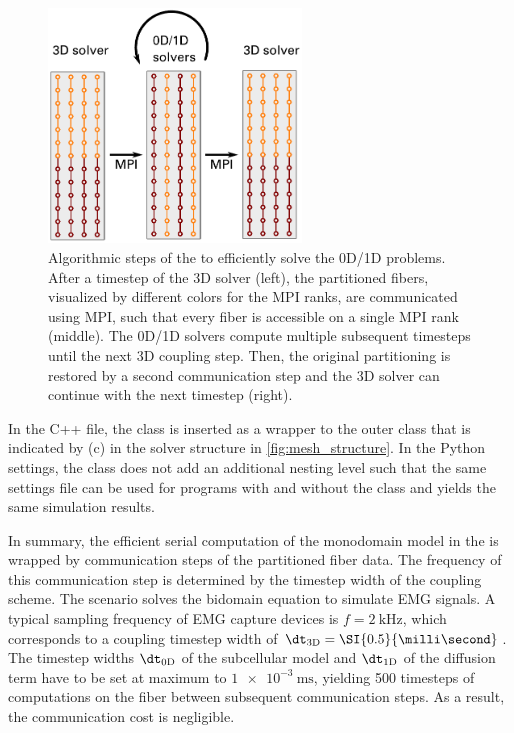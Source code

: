 \begin{figure}
  \centering%
  \includegraphics[width=0.6\textwidth]{images/implementation/fast_monodomain_scheme.pdf}
  \caption{Algorithmic steps of the  to efficiently solve the 0D/1D problems. After a timestep of the 3D solver (left), the partitioned fibers, visualized by different colors for the MPI ranks, are communicated using MPI, such that every fiber is accessible on a single MPI rank (middle). The 0D/1D solvers compute multiple subsequent timesteps until the next 3D coupling step. Then, the original partitioning is restored by a second communication step and the 3D solver can continue with the next timestep (right).}%
  \label{fig:fast_monodomain_scheme}%
\end{figure}


In the C++ file, the  class is inserted as a wrapper to the outer  class that is indicated by (c) in the solver structure in \cref{fig:mesh_structure}. In the Python settings, the class does not add an additional nesting level such that the same settings file can be used for programs with and without the  class and yields the same simulation results.

In summary, the efficient serial computation of the monodomain model in the  is wrapped by communication steps of  the partitioned fiber data. The frequency of this communication step is determined by the timestep width of the coupling scheme. 
The scenario solves the bidomain equation to simulate EMG signals. A typical sampling frequency of EMG capture devices is $f=\SI{2}{\kilo\hertz}$, which corresponds to a coupling timestep width of $\dt_\text{3D}=\SI{0.5}{\milli\second}$. The timestep widths $\dt_\text{0D}$ of the subcellular model and $\dt_\text{1D}$ of the diffusion term have to be set at maximum to $\SI{1e-3}{\milli\second}$, yielding \num{500} timesteps of computations on the fiber between subsequent communication steps. As a result, the communication cost is negligible.

